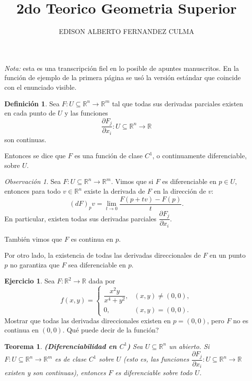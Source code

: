 \documentclass[11pt]{article}
\title{2do Teorico Geometria Superior}
\author{EDISON ALBERTO FERNANDEZ CULMA}
\date{}
\newtheorem*{theorem}{Teorema}
\theoremstyle{definition}
\newtheorem*{definition}{Definici\'on}
\newtheorem*{exercise}{Ejercicio}
\theoremstyle{remark}
\newtheorem*{remark}{Observaci\'on}
\begin{document}
\maketitle

\noindent\textit{Nota:} esta es una transcripci\'on fiel en lo posible de apuntes manuscritos. En la funci\'on de ejemplo de la primera p\'agina se us\'o la versi\'on est\'andar que coincide con el enunciado visible.

\begin{definition}
Sea $F:U\subseteq \mathbb{R}^n \to \mathbb{R}^m$ tal que todas sus derivadas parciales existen en cada punto de $U$ y las funciones
\[
\frac{\partial F_j}{\partial x_i}:U\subseteq \mathbb{R}^n \longrightarrow \mathbb{R}
\]
son continuas.

Entonces se dice que $F$ es una funci\'on de clase $C^1$, o continuamente diferenciable, sobre $U$.
\end{definition}

\begin{remark}
Sea $F:U\subseteq \mathbb{R}^n \to \mathbb{R}^m$. Vimos que si $F$ es diferenciable en $p\in U$, entonces para todo $v\in \mathbb{R}^n$ existe la derivada de $F$ en la direcci\'on de $v$:
\[
(dF)_p v=\lim_{t\to 0}\frac{F(p+tv)-F(p)}{t}.
\]
En particular, existen todas sus derivadas parciales $\dfrac{\partial F_j}{\partial x_i}$.

Tambi\'en vimos que $F$ es continua en $p$.

Por otro lado, la existencia de todas las derivadas direccionales de $F$ en un punto $p$ no garantiza que $F$ sea diferenciable en $p$.
\end{remark}

\begin{exercise}
Sea $F:\mathbb{R}^2\to \mathbb{R}$ dada por
\[
f(x,y)=
\begin{cases}
\dfrac{x^2y}{x^4+y^2}, & (x,y)\neq (0,0),\\[0.6em]
0, & (x,y)=(0,0).
\end{cases}
\]
Mostrar que todas las derivadas direccionales existen en $p=(0,0)$, pero $F$ no es continua en $(0,0)$. \textquestiondown Qu\'e puede decir de la funci\'on?
\end{exercise}

\begin{theorem}
\textbf{(Diferenciabilidad en $C^1$)}\;
Sea $U\subseteq \mathbb{R}^n$ un abierto. Si $F:U\subseteq \mathbb{R}^n\to \mathbb{R}^m$ es de clase $C^1$ sobre $U$ (esto es, las funciones $\dfrac{\partial F_j}{\partial x_i}:U\subseteq \mathbb{R}^n\to \mathbb{R}$ existen y son continuas), entonces $F$ es diferenciable sobre todo $U$.
\end{theorem}
\end{document}
